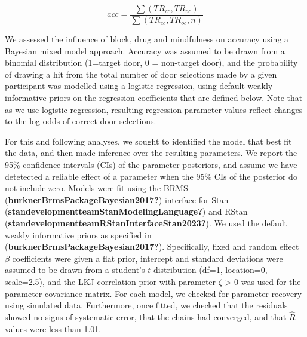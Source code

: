 \documentclass{article}
\begin{document}
\[
acc = \frac{\sum{(TR_{cc}, TR_{oc})}}{\sum{(TR_{cc}, TR_{oc}, n)}}
\]

We assessed the influence of block, drug and mindfulness on accuracy
using a Bayesian mixed model approach. Accuracy was assumed to be drawn
from a binomial distribution (1=target door, 0 = non-target door), and
the probability of drawing a hit from the total number of door
selections made by a given participant was modelled using a logistic
regression, using default weakly informative priors on the regression
coefficients that are defined below. Note that as we use logistic
regression, resulting regression parameter values reflect changes to the
log-odds of correct door selections.

For this and following analyses, we sought to identified the model that
best fit the data, and then made inference over the resulting
parameters. We report the 95\% confidence intervals (CIs) of the
parameter posteriors, and assume we have detetected a reliable effect of
a parameter when the 95\% CIs of the posterior do not include zero.
Models were fit using the BRMS
(\textbf{burknerBrmsPackageBayesian2017?}) interface for Stan
(\textbf{standevelopmentteamStanModelingLanguage?}) and RStan
(\textbf{standevelopmentteamRStanInterfaceStan2023?}). We used the
default weakly informative priors as specified in
(\textbf{burknerBrmsPackageBayesian2017?}). Specifically, fixed and
random effect \(\beta\) coefficients were given a flat prior, intercept
and standard deviations were assumed to be drawn from a student's \(t\)
distribution (df=1, location=0, scale=2.5), and the LKJ-correlation
prior with parameter \(\zeta\) \textgreater{} 0 was used for the
parameter covariance matrix. For each model, we checked for parameter
recovery using simulated data. Furthermore, once fitted, we checked that
the residuals showed no signs of systematic error, that the chains had
converged, and that \(\hat{R}\) values were less than 1.01.
\end{document}
